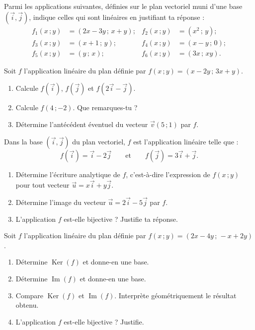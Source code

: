 \documentclass[11pt]{article}
\newcounter{popsec}
\newcounter{popsub}
\newcommand{\courssub}[1]{%
  \stepcounter{popsub}%
  \par\vspace{9pt}\noindent{\popxbold\fontsize{11.5}{13}\selectfont\color{popink}{\color{poporange}\thepopsec.\thepopsub}\hspace{6pt}#1}\par\nopagebreak\vspace{4pt}
}
\begin{document}
\begin{exercice}
Parmi les applications suivantes, définies sur le plan vectoriel muni d'une base $(\vec{i},\vec{j})$, indique celles qui sont linéaires en justifiant ta réponse :
\begin{align*}
f_1(x\,;y)&=(2x-3y\,;\,x+y) ; & f_2(x\,;y)&=(x^2\,;\,y) ;\\
f_3(x\,;y)&=(x+1\,;\,y) ; & f_4(x\,;y)&=(x-y\,;\,0) ;\\
f_5(x\,;y)&=(y\,;\,x) ; & f_6(x\,;y)&=(3x\,;\,xy).
\end{align*}
\end{exercice}

\begin{exercice}
Soit $f$ l'application linéaire du plan définie par $f(x\,;y)=(x-2y\,;\,3x+y)$.
\begin{enumerate}
\item Calcule $f(\vec{i})$, $f(\vec{j})$ et $f(2\vec{i}-\vec{j})$.
\item Calcule $f(4\,;-2)$. Que remarques-tu ?
\item Détermine l'antécédent éventuel du vecteur $\vec{v}(5\,;1)$ par $f$.
\end{enumerate}
\end{exercice}

\courssub{Je m'entraîne}

\begin{exercice}
Dans la base $(\vec{i},\vec{j})$ du plan vectoriel, $f$ est l'application linéaire telle que :
\[ f(\vec{i})=\vec{i}-2\vec{j} \qquad \text{et} \qquad f(\vec{j})=3\vec{i}+\vec{j}. \]
\begin{enumerate}
\item Détermine l'écriture analytique de $f$, c'est-à-dire l'expression de $f(x\,;y)$ pour tout vecteur $\vec{u}=x\vec{i}+y\vec{j}$.
\item Détermine l'image du vecteur $\vec{u}=2\vec{i}-5\vec{j}$ par $f$.
\item L'application $f$ est-elle bijective ? Justifie ta réponse.
\end{enumerate}
\end{exercice}

\begin{exercice}
Soit $f$ l'application linéaire du plan définie par $f(x\,;y)=(2x-4y\,;\,-x+2y)$.
\begin{enumerate}
\item Détermine $\operatorname{Ker}(f)$ et donne-en une base.
\item Détermine $\operatorname{Im}(f)$ et donne-en une base.
\item Compare $\operatorname{Ker}(f)$ et $\operatorname{Im}(f)$. Interprète géométriquement le résultat obtenu.
\item L'application $f$ est-elle bijective ? Justifie.
\end{enumerate}
\end{exercice}
\end{document}
